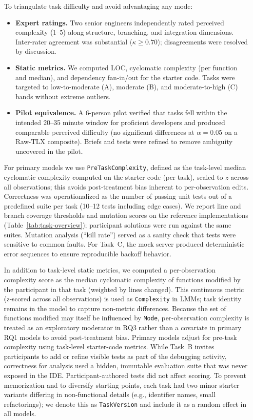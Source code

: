 \documentclass[sigconf]{acmart}
\begin{document}
To triangulate task difficulty and avoid advantaging any mode:
\begin{itemize}[leftmargin=1.2em]
  \item \textbf{Expert ratings.} Two senior engineers independently rated perceived complexity (1--5) along structure, branching, and integration dimensions. Inter-rater agreement was substantial ($\kappa \geq 0.70$); disagreements were resolved by discussion.
  \item \textbf{Static metrics.} We computed LOC, cyclomatic complexity (per function and median), and dependency fan-in/out for the starter code. Tasks were targeted to low-to-moderate (A), moderate (B), and moderate-to-high (C) bands without extreme outliers.
  \item \textbf{Pilot equivalence.} A 6-person pilot verified that tasks fell within the intended 20--35 minute window for proficient developers and produced comparable perceived difficulty (no significant differences at $\alpha=0.05$ on a Raw-TLX composite). Briefs and tests were refined to remove ambiguity uncovered in the pilot.
\end{itemize}
For primary models we use \texttt{PreTaskComplexity}, defined as the task-level median cyclomatic complexity computed on the starter code (per task), scaled to $z$ across all observations; this avoids post-treatment bias inherent to per-observation edits. Correctness was operationalized as the number of passing unit tests out of a predefined suite per task (10--12 tests including edge cases). We report line and branch coverage thresholds and mutation scores on the reference implementations (Table~\ref{tab:task-overview}); participant solutions were run against the same suites. Mutation analysis (``kill rate'') served as a sanity check that tests were sensitive to common faults. For Task~C, the mock server produced deterministic error sequences to ensure reproducible backoff behavior.

In addition to task-level static metrics, we computed a per\hyp{}observation complexity score as the median cyclomatic complexity of functions modified by the participant in that task (weighted by lines changed). This continuous metric (z-scored across all observations) is used as \texttt{Complexity} in LMMs; task identity remains in the model to capture non-metric differences. Because the set of functions modified may itself be influenced by \texttt{Mode}, per-observation complexity is treated as an exploratory moderator in RQ3 rather than a covariate in primary RQ1 models to avoid post-treatment bias. Primary models adjust for pre-task complexity using task-level starter-code metrics. While Task~B invites participants to add or refine visible tests as part of the debugging activity, correctness for analysis used a hidden, immutable evaluation suite that was never exposed in the IDE. Participant-authored tests did not affect scoring. To prevent memorization and to diversify starting points, each task had two minor starter variants differing in non-functional details (e.g., identifier names, small refactorings); we denote this as \texttt{TaskVersion} and include it as a random effect in all models.
\end{document}
